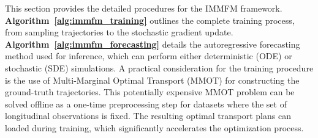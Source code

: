 \documentclass[twoside]{article}
\begin{document}
This section provides the detailed procedures for the IMMFM framework. \textbf{Algorithm~\ref{alg:immfm_training}} outlines the complete training process, from sampling trajectories to the stochastic gradient update. \textbf{Algorithm~\ref{alg:immfm_forecasting}} details the autoregressive forecasting method used for inference, which can perform either deterministic (ODE) or stochastic (SDE) simulations. A practical consideration for the training procedure is the use of Multi-Marginal Optimal Transport (MMOT) for constructing the ground-truth trajectories. This potentially expensive MMOT problem can be solved offline as a one-time preprocessing step for datasets where the set of longitudinal observations is fixed. The resulting optimal transport plans can loaded during training, which significantly accelerates the optimization process.
\end{document}
